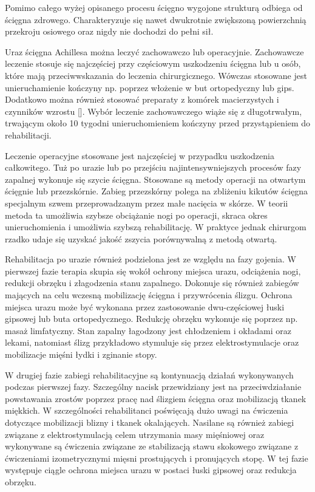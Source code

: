 Pomimo całego wyżej opisanego procesu ścięgno wygojone strukturą odbiega od ścięgna zdrowego. Charakteryzuje się nawet dwukrotnie zwiększoną powierzchnią przekroju osiowego oraz nigdy nie dochodzi do pełni sił. 

Uraz ścięgna Achillesa można leczyć zachowawczo lub operacyjnie. Zachowawcze leczenie stosuje się najczęściej przy częściowym uszkodzeniu ścięgna lub u osób, które mają przeciwwskazania do leczenia chirurgicznego. Wówczas stosowane jest unieruchamienie kończyny np. poprzez włożenie w but ortopedyczny lub gips. Dodatkowo można również stosować preparaty z komórek macierzystych i czynników wzrostu []. Wybór leczenie zachowawczego wiąże się z długotrwałym, trwającym około 10 tygodni unieruchomieniem kończyny przed przystąpieniem do rehabilitacji.

Leczenie operacyjne stosowane jest najczęściej w przypadku uszkodzenia całkowitego. Tuż po urazie lub po przejściu najintensywniejszych procesów fazy zapalnej wykonuje się szycie ścięgna. Stosowane są metody operacji na otwartym ścięgnie lub przezskórnie. Zabieg przezskórny polega na zbliżeniu kikutów ścięgna specjalnym szwem przeprowadzanym przez małe nacięcia w skórze. W teorii metoda ta umożliwia szybsze obciążanie nogi po operacji, skraca okres unieruchomienia i umożliwia szybszą rehabilitację. W praktyce jednak chirurgom rzadko udaje się uzyskać jakość zszycia porównywalną z metodą otwartą. 

Rehabilitacja po urazie również podzielona jest ze względu na fazy gojenia. W pierwszej fazie terapia skupia się wokół ochrony miejsca urazu, odciążenia nogi, redukcji obrzęku i złagodzenia stanu zapalnego. Dokonuje się również zabiegów mających na celu wczesną mobilizację ścięgna i przywrócenia ślizgu. Ochrona miejsca urazu może być wykonana przez zastosowanie dwu-częściowej łuski gipsowej lub buta ortopedycznego. Redukcję obrzęku wykonuje się poprzez np. masaż limfatyczny. Stan zapalny łagodzony jest chłodzeniem i okładami oraz lekami, natomiast ślizg przykładowo stymuluje się przez elektrostymulacje oraz mobilizacje mięśni łydki i zginanie stopy.

W drugiej fazie zabiegi rehabilitacyjne są kontynuacją działań wykonywanych podczas pierwszej fazy. Szczególny nacisk przewidziany jest na przeciwdziałanie powstawania zrostów poprzez pracę nad ślizgiem ścięgna oraz mobilizacją tkanek miękkich. W szczególności rehabilitanci poświęcają dużo uwagi na ćwiczenia dotyczące mobilizacji blizny i tkanek okalających. Nasilane są również zabiegi związane z elektrostymulacją celem utrzymania masy mięśniowej oraz wykonywane są ćwiczenia związane ze stabilizacją stawu skokowego związane z ćwiczeniami izometrycznymi mięsni prostujących i pronujących stopę. W tej fazie występuje ciągle ochrona miejsca urazu w postaci łuski gipsowej oraz redukcja obrzęku.

